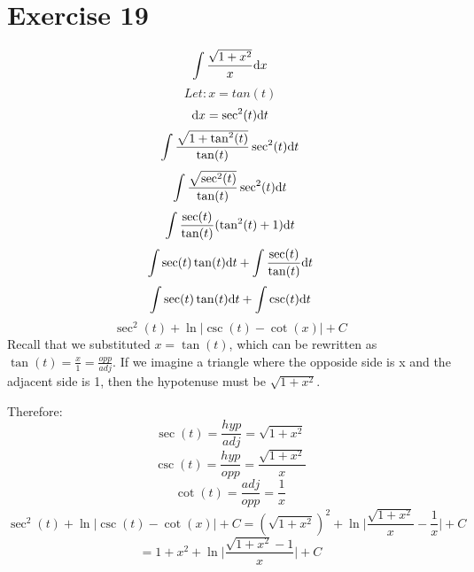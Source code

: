 \documentclass{math}
\begin{document}
\section*{Exercise 19}
\[ \int{\frac{\sqrt{1+x^{2}}}{x}\mathrm{d}{x}} \]
\[ Let: x = tan(t) \]
\[ \mathrm{d}{x} = \sec^{2}(t)\mathrm{d}{t} \]
\[ \int{\frac{\sqrt{1+\tan^{2}(t)}}{\tan(t)}\sec^{2}(t)\mathrm{d}{t}} \]
\[ \int{\frac{\sqrt{\sec^{2}(t)}}{\tan(t)}\sec^{2}(t)\mathrm{d}{t}} \]
\[ \int{\frac{\sec(t)}{\tan(t)}(\tan^{2}(t)+1)\mathrm{d}{t}} \]
\[ \int{\sec(t)\tan(t)\mathrm{d}{t}}+\int{\frac{\sec(t)}{\tan(t)}\mathrm{d}{t}} \]
\[ \int{\sec(t)\tan(t)\mathrm{d}{t}}+\int{\csc(t)}\mathrm{d}{t} \]
\[ \sec^{2}(t)+\ln|\csc(t)-\cot(x)|+C \]
Recall that we substituted \( x=\tan(t) \), which can be rewritten as
\( \tan(t) = \frac{x}{1} = \frac{opp}{adj} \). If we imagine a triangle where
the opposide side is x and the adjacent side is 1, then the hypotenuse must be
\( \sqrt{1+x^{2}} \).
\begin{center}
\end{center}
Therefore:
\[ \sec(t) = \frac{hyp}{adj} = \sqrt{1+x^{2}} \]
\[ \csc(t) = \frac{hyp}{opp} = \frac{\sqrt{1+x^{2}}}{x} \]
\[ \cot(t) = \frac{adj}{opp} = \frac{1}{x} \]
\[ \sec^{2}(t)+\ln|\csc(t)-\cot(x)|+C = (\sqrt{1+x^{2}})^{2}+
   \ln\bigg|\frac{\sqrt{1+x^{2}}}{x}-\frac{1}{x}\bigg|+C \]
\[ = 1+x^{2}+\ln\bigg|\frac{\sqrt{1+x^{2}}-1}{x}\bigg|+C \]
\end{document}
